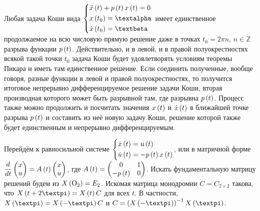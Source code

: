 \documentclass[a5paper,10pt]{article}
\begin{document}
Любая задача Коши вида 
$\tsys{& \ddot {x}\br{t} + p\br{t} x\br{t} = 0
\\& x\br{t_{0}} = \alpha
\\& \dot{x}\br{t_{0}} = \beta}$
имеет единственное продолжаемое на всю числовую прямую решение даже в точках $t_{0} = 2\pi n$, $n \in \mathbb{Z}$ разрыва функции $p\left(t\right)$. Действительно, и в левой, и в правой полуокрестностях всякой такой точки $t_{0}$ задача Коши будет удовлетворять условиям теоремы Пикара и иметь там единственное решение. Если соединить полученные, вообще говоря, разные функции в левой и правой полуокрестностях, то получится итоговое непрерывно дифференцируемое решение задачи Коши, вторая производная которого может быть разрывной там, где разрывна $p\left(t\right)$. Процесс также можно продолжить и посчитать значения $x\left(t\right)$ и $\dot{x}\left(t\right)$ в ближайшей точке разрыва $p\left(t\right)$ и составить из неё новую задачу Коши, решение которой также будет единственным и непрерывно дифференцируемым.

Перейдём к равносильной системе $\left\{ \begin{aligned}& \dot{x}\left(t\right) = u\left(t\right) \\& \dot{u}\left(t\right) = -p\left(t\right) x\left(t\right)\end{aligned} \right.$, или в матричной форме 
$\dfrac {d} {dt}
\begin{pmatrix} x \\ u \end{pmatrix}
\linebreak = A\br{t}
\begin{pmatrix} x \\ u \end{pmatrix}$, где 
$A\left(t\right) = \begin{pmatrix}0 & 1 \\ -p\left(t\right) & 0 \end{pmatrix}$. Искать фундаментальную матрицу решений будем из $X\left(\text{O}_{2}\right) = E_{2}$. Искомая матрица монодромии $C = C_{2 \times 2}$ такова, что 
$X\br{t + 2\pi} = X\br{t} C$ для всех $t$. В частности, $X\br{\pi} = X\br{-\pi} C$ и $C = \br{X\br{-\pi}}^{-1} X\br{\pi}$.
\end{document}
